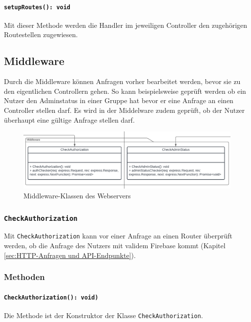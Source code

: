 \documentclass{entwurfsheft}
\begin{document}
\begin{sloppypar}
\paragraph{\texttt{setupRoutes(): void}}
Mit dieser Methode werden die Handler im jeweiligen Controller den zugehörigen Routestellen zugewiesen.

\newpage

\subsection{Middleware} \label{sec:Middleware}
Durch die Middleware können Anfragen vorher bearbeitet werden, bevor sie zu den eigentlichen Controllern gehen.
So kann beispielsweise geprüft werden ob ein Nutzer den Adminstatus in einer Gruppe hat bevor er eine Anfrage an einen Controller stellen darf.
Es wird in der Middelware zudem geprüft, ob der Nutzer überhaupt eine gültige Anfrage stellen darf.

\begin{figure}[htp]
    \centering
    \includegraphics[width = 1\textwidth]{images/webserver/middleware.pdf}
    \caption{Middleware-Klassen des Webservers}
    \label{fig:middleware}
\end{figure}

\subsubsection{\texttt{CheckAuthorization}}\label{sec:CheckAuthorization}
Mit \texttt{CheckAuthorization} kann vor einer Anfrage an einen Router überprüft werden, ob die Anfrage des Nutzers mit validem Firebase  kommt (Kapitel \ref{sec:HTTP-Anfragen und API-Endpunkte}).
\subsubsection*{Methoden}
\paragraph{\texttt{CheckAuthorization(): void)}}
Die Methode ist der Konstruktor der Klasse \texttt{CheckAuthoriza\-tion}.

\end{sloppypar}
\end{document}
